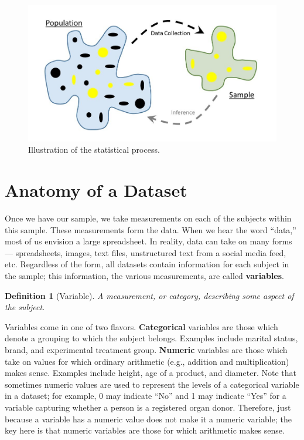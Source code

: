 \documentclass[
]{book}
\theoremstyle{plain}
\theoremstyle{mydefn}
\newtheorem{definition}{Definition}[chapter]
\theoremstyle{myexmpl}
\theoremstyle{remark}
\begin{document}
\begin{figure}

{\centering \includegraphics[width=0.8\linewidth]{images/Basics-Stat-Process} 

}

\caption{Illustration of the statistical process.}\label{fig:basics-statistical-process}
\end{figure}

\hypertarget{anatomy-of-a-dataset}{%
\section{Anatomy of a Dataset}\label{anatomy-of-a-dataset}}

Once we have our sample, we take measurements on each of the subjects within this sample. These measurements form the data. When we hear the word ``data,'' most of us envision a large spreadsheet. In reality, data can take on many forms --- spreadsheets, images, text files, unstructured text from a social media feed, etc. Regardless of the form, all datasets contain information for each subject in the sample; this information, the various measurements, are called \textbf{variables}.

\begin{definition}[Variable]
\protect\hypertarget{def:defn-variable}{}{\label{def:defn-variable} {} }A measurement, or category, describing some aspect of the subject.
\end{definition}

Variables come in one of two flavors. \textbf{Categorical} variables are those which denote a grouping to which the subject belongs. Examples include marital status, brand, and experimental treatment group. \textbf{Numeric} variables are those which take on values for which ordinary arithmetic (e.g., addition and multiplication) makes sense. Examples include height, age of a product, and diameter. Note that sometimes numeric values are used to represent the levels of a categorical variable in a dataset; for example, 0 may indicate ``No'' and 1 may indicate ``Yes'' for a variable capturing whether a person is a registered organ donor. Therefore, just because a variable has a numeric value does not make it a numeric variable; the key here is that numeric variables are those for which arithmetic makes sense.
\end{document}
